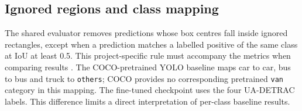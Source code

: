 \subsection{Ignored regions and class mapping}
The shared evaluator removes predictions whose box centres fall inside ignored rectangles, except when a prediction matches a labelled positive of the same class at IoU at least 0.5. This project-specific rule must accompany the metrics when comparing results \cite{evaluationcode}. The COCO-pretrained YOLO baseline maps car to car, bus to bus and truck to \texttt{others}; COCO provides no corresponding pretrained \texttt{van} category in this mapping. The fine-tuned checkpoint uses the four UA-DETRAC labels. This difference limits a direct interpretation of per-class baseline results.
